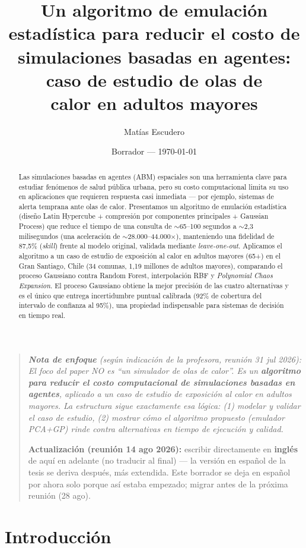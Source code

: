 \documentclass[11pt,a4paper]{article}
\title{Un algoritmo de emulación estadística para reducir el costo de\\
       simulaciones basadas en agentes: caso de estudio de olas de\\
       calor en adultos mayores}
\author{Matías Escudero}
\date{Borrador --- \today}
\newcommand{\notaenfoque}[1]{%
    \begin{quote}
    \small\itshape\color{gray!70!black} #1
    \end{quote}
}
\begin{document}
\maketitle

\notaenfoque{
\textbf{Nota de enfoque} (según indicación de la profesora, reunión 31 jul 2026):
El foco del paper NO es ``un simulador de olas de calor''. Es un
\textbf{algoritmo para reducir el costo computacional de simulaciones
basadas en agentes}, aplicado a un caso de estudio de exposición al calor
en adultos mayores. La estructura sigue exactamente esa lógica: (1) modelar
y validar el caso de estudio, (2) mostrar cómo el algoritmo propuesto
(emulador PCA+GP) rinde contra alternativas en tiempo de ejecución y calidad.

\textbf{Actualización (reunión 14 ago 2026):} escribir directamente en
\textbf{inglés} de aquí en adelante (no traducir al final) --- la versión en
español de la tesis se deriva después, más extendida. Este borrador se deja
en español por ahora solo porque así estaba empezado; migrar antes de la
próxima reunión (28 ago).
}

\begin{abstract}
Las simulaciones basadas en agentes (ABM) espaciales son una herramienta
clave para estudiar fenómenos de salud pública urbana, pero su costo
computacional limita su uso en aplicaciones que requieren respuesta casi
inmediata --- por ejemplo, sistemas de alerta temprana ante olas de calor.
Presentamos un algoritmo de emulación estadística (diseño Latin Hypercube +
compresión por componentes principales + Gaussian Process) que reduce el
tiempo de una consulta de $\sim$65--100 segundos a $\sim$2,3 milisegundos
(una aceleración de $\sim$28.000--44.000$\times$), manteniendo una fidelidad
de 87,5\% (\emph{skill}) frente al modelo original, validada mediante
\emph{leave-one-out}. Aplicamos el algoritmo a un caso de estudio de
exposición al calor en adultos mayores (65+) en el Gran Santiago, Chile
(34 comunas, 1,19 millones de adultos mayores), comparando el proceso
Gaussiano contra Random Forest, interpolación RBF y \emph{Polynomial Chaos
Expansion}. El proceso Gaussiano obtiene la mejor precisión de las cuatro
alternativas y es el único que entrega incertidumbre puntual calibrada
(92\% de cobertura del intervalo de confianza al 95\%), una propiedad
indispensable para sistemas de decisión en tiempo real.
\end{abstract}

\section{Introducción}
\end{document}
